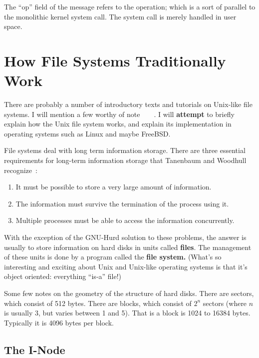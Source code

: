 The ``op'' field of the message refers to the operation; which is a sort of parallel to the monolithic kernel system call. The system call is merely handled in user space.

\section{How File Systems Traditionally Work}

There are probably a number of introductory texts and tutorials on Unix-like file systems. I will mention a few worthy of note~\cite{skelix}~\cite{minixbook}~\cite{bsdbook}~\cite{linuxbook}. I will \textbf{attempt} to briefly explain how the Unix file system works, and explain its implementation in operating systems such as Linux and maybe FreeBSD.

File systems deal with long term information storage. There are three essential requirements for long-term information storage that Tanenbaum and Woodhull recognize~\cite{minixbook}:
\begin{enumerate}
 \item It must be possible to store a very large amount of information.
 \item The information must survive the termination of the process using it.
 \item Multiple processes must be able to access the information concurrently.
\end{enumerate}
With the exception of the GNU-Hurd solution to these problems, the answer is usually to store information on hard disks in units called \textbf{files}. The management of these units is done by a program called the \textbf{file system.} (What's so interesting and exciting about Unix and Unix-like operating systems is that it's object oriented: everything ``is-a'' file!)

Some few notes on the geometry of the structure of hard disks. There are sectors, which consist of 512 bytes. There are blocks, which consist of $2^{n}$ sectors (where $n$ is usually 3, but varies between 1 and 5). That is a block is 1024 to 16384 bytes. Typically it is 4096 bytes per block.

\subsection{The I-Node}

